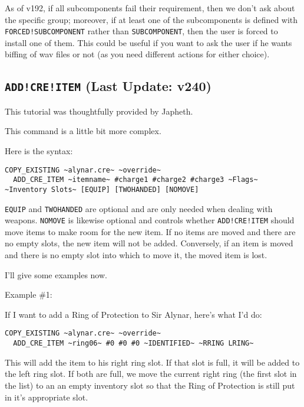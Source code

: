 \documentclass{article}
\def\DEFINE#1{{\tt \bf #1}\label{#1}\index{#1}}
\def\t#1{{\tt #1}}
\begin{document}
As of v192, if all subcomponents fail their requirement, then we don't ask about
the specific group; moreover, if at least one of the subcomponents is defined with
\t{FORCED!SUBCOMPONENT} rather than \t{SUBCOMPONENT}, then the user is forced to
install one of them. This could be useful if you want to ask the user if he wants
biffing of wav files or not (as you need different actions for either choice).

\subsection{\DEFINE{ADD!CRE!ITEM} (Last Update: v240)}
This tutorial was thoughtfully provided by Japheth.

This command is a little bit more complex.

Here is the syntax:

\begin{verbatim}
COPY_EXISTING ~alynar.cre~ ~override~
  ADD_CRE_ITEM ~itemname~ #charge1 #charge2 #charge3 ~Flags~ ~Inventory Slots~ [EQUIP] [TWOHANDED] [NOMOVE]
\end{verbatim}

\t{EQUIP} and \t{TWOHANDED} are optional and are only needed when
dealing with weapons. \t{NOMOVE} is likewise optional and controls
whether \t{ADD!CRE!ITEM} should move items to make room for the new
item. If no items are moved and there are no empty slots, the new item
will not be added. Conversely, if an item is moved and there is no
empty slot into which to move it, the moved item is lost.

I'll give some examples now.

Example \#1:

If I want to add a Ring of Protection to Sir Alynar, here's what I'd do:

\begin{verbatim}
COPY_EXISTING ~alynar.cre~ ~override~
  ADD_CRE_ITEM ~ring06~ #0 #0 #0 ~IDENTIFIED~ ~RRING LRING~
\end{verbatim}

This will add the item to his right ring slot. If that slot is full, it
will be added to the left ring slot. If both are full, we move the current
right ring (the first slot in the list) to an an empty inventory slot so
that the Ring of Protection is still put in it's appropriate slot.
\end{document}
